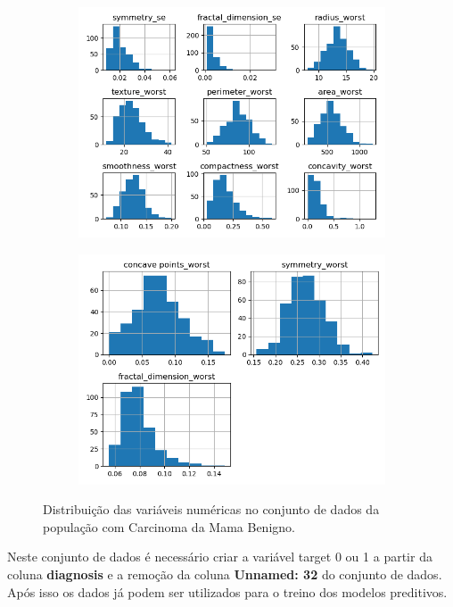 \begin{figure}[H]
\begin{subfigure}[b]{0.3\textwidth}
\includegraphics[scale=0.3]{images/hist_cancer_no_3.png}
     \end{subfigure}
          \hfill
     \begin{subfigure}[b]{0.3\textwidth}
 \centering
\includegraphics[scale=0.3]{images/hist_cancer_no_4.png}
     \end{subfigure}
        \caption{Distribuição das variáveis numéricas no conjunto de dados da população com Carcinoma da Mama Benigno.}
         \label{fig:var:cancer:b}
\end{figure}


Neste conjunto de dados é necessário criar a variável target 0 ou 1 a partir da coluna
\textbf{diagnosis} e a remoção da coluna \textbf{Unnamed: 32} do conjunto de dados. Após isso os dados já podem ser utilizados para o treino dos modelos preditivos.

